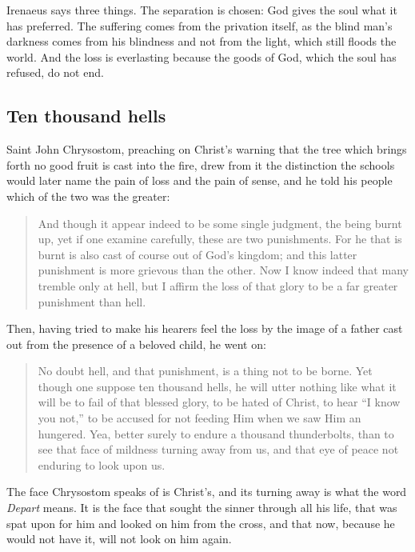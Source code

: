 Irenaeus says three things. The separation is chosen: God gives the soul what it has preferred. The suffering comes from the privation itself, as the blind man's darkness comes from his blindness and not from the light, which still floods the world. And the loss is everlasting because the goods of God, which the soul has refused, do not end.

\subsection{Ten thousand hells}

Saint John Chrysostom, preaching on Christ's warning that the tree which brings forth no good fruit is cast into the fire, drew from it the distinction the schools would later name the pain of loss and the pain of sense, and he told his people which of the two was the greater:

\begin{quote}
And though it appear indeed to be some single judgment, the being burnt up, yet if one examine carefully, these are two punishments. For he that is burnt is also cast of course out of God's kingdom; and this latter punishment is more grievous than the other. Now I know indeed that many tremble only at hell, but I affirm the loss of that glory to be a far greater punishment than hell.
\end{quote}

\noindent Then, having tried to make his hearers feel the loss by the image of a father cast out from the presence of a beloved child, he went on:

\begin{quote}
No doubt hell, and that punishment, is a thing not to be borne. Yet though one suppose ten thousand hells, he will utter nothing like what it will be to fail of that blessed glory, to be hated of Christ, to hear ``I know you not,'' to be accused for not feeding Him when we saw Him an hungered. Yea, better surely to endure a thousand thunderbolts, than to see that face of mildness turning away from us, and that eye of peace not enduring to look upon us.
\end{quote}

The face Chrysostom speaks of is Christ's, and its turning away is what the word \emph{Depart} means. It is the face that sought the sinner through all his life, that was spat upon for him and looked on him from the cross, and that now, because he would not have it, will not look on him again.

